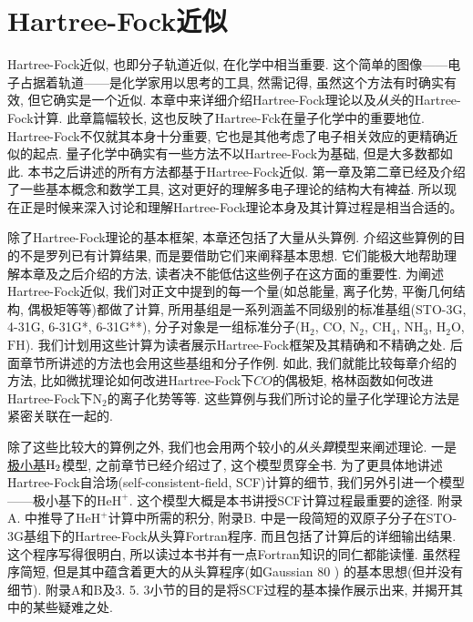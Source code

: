 \chapter{Hartree-Fock近似}
Hartree-Fock近似, 也即分子轨道近似, 在化学中相当重要. 
这个简单的图像——电子占据着轨道——是化学家用以思考的工具, 
然需记得, 虽然这个方法有时确实有效, 但它确实是一个近似. 
本章中来详细介绍Hartree-Fock理论以及\emph{从头}的Hartree-Fock计算. 
此章篇幅较长, 这也反映了Hartree-Fck在量子化学中的重要地位. 
Hartree-Fock不仅就其本身十分重要, 它也是其他考虑了电子相关效应的更精确近似的起点. 
量子化学中确实有一些方法不以Hartree-Fock为基础, 但是大多数都如此. 
本书之后讲述的所有方法都基于Hartree-Fock近似. 
第一章及第二章已经及介绍了一些基本概念和数学工具, 这对更好的理解多电子理论的结构大有裨益. 所以现在正是时候来深入讨论和理解Hartree-Fock理论本身及其计算过程是相当合适的。

除了Hartree-Fock理论的基本框架, 
本章还包括了大量从头算例.
介绍这些算例的目的不是罗列已有计算结果, 
而是要借助它们来阐释基本思想. 
它们能极大地帮助理解本章及之后介绍的方法, 
读者决不能低估这些例子在这方面的重要性. 
为阐述Hartree-Fock近似, 
我们对正文中提到的每一个量(如总能量, 
离子化势, 
平衡几何结构, 
偶极矩等等)都做了计算, 
所用基组是一系列涵盖不同级别的标准基组(STO-3G, 
4-31G, 
6-31G*, 
6-31G**), 
分子对象是一组标准分子($\mathrm{H}_2$, 
$\mathrm{CO}$, 
$\mathrm{N}_2$, 
$\mathrm{CH}_4$, 
$\mathrm{NH}_3$, 
$\mathrm{H}_2\mathrm{O}$, 
$\mathrm{FH}$). 
我们计划用这些计算为读者展示Hartree-Fock框架及其精确和不精确之处. 
后面章节所讲述的方法也会用这些基组和分子作例. 
如此, 
我们就能比较每章介绍的方法, 
比如微扰理论如何改进Hartree-Fock下$CO$的偶极矩, 
格林函数如何改进Hartree-Fock下$\mathrm{N}_2$的离子化势等等. 
这些算例与我们所讨论的量子化学理论方法是紧密关联在一起的.


除了这些比较大的算例之外, 
我们也会用两个较小的\emph{从头算}模型来阐述理论. 
一是\underline{极小基$\mathrm{H}_2$}模型, 
之前章节已经介绍过了, 
这个模型贯穿全书. 
为了更具体地讲述Hartree-Fock自洽场(self-consistent-field, 
SCF)计算的细节, 
我们另外引进一个模型——极小基下的$\mathrm{HeH}^+$. 
这个模型大概是本书讲授SCF计算过程最重要的途径. 
附录A.
中推导了$\mathrm{HeH}^+$计算中所需的积分, 
附录B.
中是一段简短的双原子分子在STO-3G基组下的Hartree-Fock从头算Fortran程序. 
而且包括了计算后的详细输出结果. 
这个程序写得很明白, 
所以读过本书并有一点Fortran知识的同仁都能读懂. 
虽然程序简短, 
但是其中蕴含着更大的从头算程序(如Gaussian 80
)
的基本思想(但并没有细节). 
附录A和B及3.
5.
3小节的目的是将SCF过程的基本操作展示出来, 
并揭开其中的某些疑难之处.


